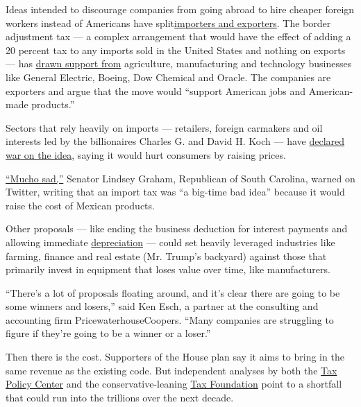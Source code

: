Ideas intended to discourage companies from going abroad to hire cheaper
foreign workers instead of Americans have
split\href{http://fortune.com/2017/02/01/walmart-target-border-tax-trump/}{importers
and exporters}. The border adjustment tax --- a complex arrangement that
would have the effect of adding a 20 percent tax to any imports sold in
the United States and nothing on exports --- has
\href{http://www.americanmadecoalition.org/?utm_source=google\&utm_campaign=border\%20tax\&utm_medium=search}{drawn
support from} agriculture, manufacturing and technology businesses like
General Electric, Boeing, Dow Chemical and Oracle. The companies are
exporters and argue that the move would ``support American jobs and
American-made products.''

Sectors that rely heavily on imports --- retailers, foreign carmakers
and oil interests led by the billionaires Charles G. and David H. Koch
--- have
\href{https://www.keepamericaaffordable.com/content.aspx?page=About}{declared
war on the idea}, saying it would hurt consumers by raising prices.

\href{http://www.forbes.com/forbes/welcome/?toURL=http://www.forbes.com/sites/kellyphillipserb/2017/01/27/lindsey-graham-tweets-concern-over-trumps-mucho-sad-border-tax-proposal/\&refURL=https://www.google.com/\&referrer=https://www.google.com/}{``Mucho
sad,''} Senator Lindsey Graham, Republican of South Carolina, warned on
Twitter, writing that an import tax was ``a big-time bad idea'' because
it would raise the cost of Mexican products.

Other proposals --- like ending the business deduction for interest
payments and allowing immediate
\href{https://www.irs.gov/businesses/small-businesses-self-employed/a-brief-overview-of-depreciation}{depreciation}
--- could set heavily leveraged industries like farming, finance and
real estate (Mr. Trump's backyard) against those that primarily invest
in equipment that loses value over time, like manufacturers.

``There's a lot of proposals floating around, and it's clear there are
going to be some winners and losers,'' said Ken Esch, a partner at the
consulting and accounting firm PricewaterhouseCoopers. ``Many companies
are struggling to figure if they're going to be a winner or a loser.''

Then there is the cost. Supporters of the House plan say it aims to
bring in the same revenue as the existing code. But independent analyses
by both the
\href{http://www.taxpolicycenter.org/publications/analysis-house-gop-tax-plan}{Tax
Policy Center} and the conservative-leaning
\href{https://taxfoundation.org/details-and-analysis-2016-house-republican-tax-reform-plan/}{Tax
Foundation} point to a shortfall that could run into the trillions over
the next decade.

